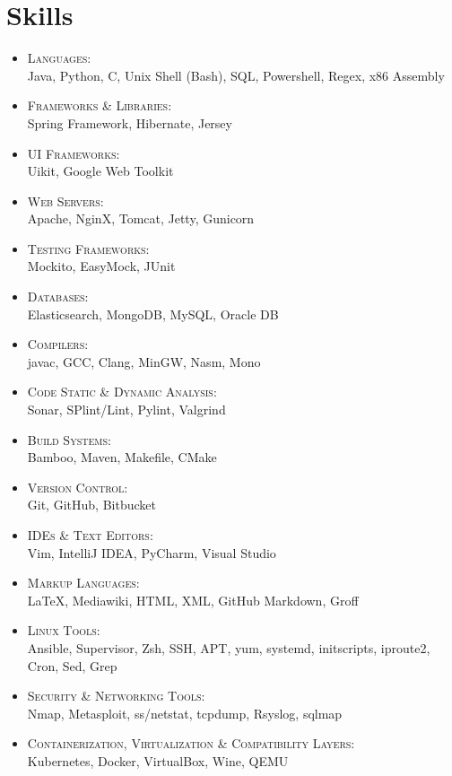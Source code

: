\documentclass[a4paper,10pt]{article}
\begin{document}
\section{Skills}
\begin{itemize}
\item \textsc{Languages}:\\
	Java, Python, C, Unix Shell (Bash), SQL, Powershell, Regex, x86 Assembly
\item \textsc{Frameworks \& Libraries}:\\
	Spring Framework, Hibernate, Jersey
\item \textsc{UI Frameworks}:\\
	Uikit, Google Web Toolkit
\item \textsc{Web Servers}:\\
	Apache, NginX, Tomcat, Jetty, Gunicorn
\item \textsc{Testing Frameworks}:\\
	Mockito, EasyMock, JUnit
\item \textsc{Databases}:\\
	Elasticsearch, MongoDB, MySQL, Oracle DB
\item \textsc{Compilers}:\\
	javac, GCC, Clang, MinGW, Nasm, Mono
\item \textsc{Code Static \& Dynamic Analysis}:\\
	Sonar, SPlint/Lint, Pylint, Valgrind
\item \textsc{Build Systems}:\\
	Bamboo, Maven, Makefile, CMake
\item \textsc{Version Control}:\\
	Git, GitHub, Bitbucket
\item \textsc{IDEs \& Text Editors}:\\
	Vim, IntelliJ IDEA, PyCharm, Visual Studio
\item \textsc{Markup Languages}:\\
	\LaTeX, Mediawiki, HTML, XML, GitHub Markdown, Groff
\item \textsc{Linux Tools}:\\
	Ansible, Supervisor, Zsh, SSH, APT, yum, systemd, initscripts, iproute2, Cron, Sed, Grep
\item \textsc{Security \& Networking Tools}:\\
	Nmap, Metasploit, ss/netstat, tcpdump, Rsyslog, sqlmap
\item \textsc{Containerization, Virtualization \& Compatibility Layers}:\\
	Kubernetes, Docker, VirtualBox, Wine, QEMU
\end{itemize}
\end{document}
